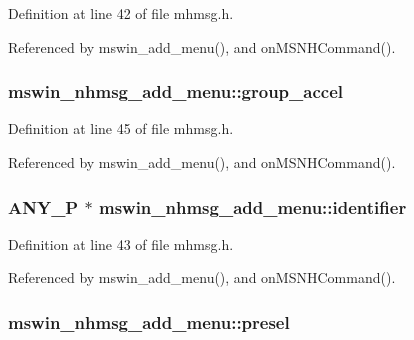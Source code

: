 Definition at line 42 of file mhmsg.\+h.



Referenced by mswin\+\_\+add\+\_\+menu(), and on\+M\+S\+N\+H\+Command().

\hypertarget{structmswin__nhmsg__add__menu_a5ad28b8447917e56539afb498fffc98a}{
\subsubsection[{group\+\_\+accel}]{ mswin\+\_\+nhmsg\+\_\+add\+\_\+menu\+::group\+\_\+accel}}\label{structmswin__nhmsg__add__menu_a5ad28b8447917e56539afb498fffc98a}


Definition at line 45 of file mhmsg.\+h.



Referenced by mswin\+\_\+add\+\_\+menu(), and on\+M\+S\+N\+H\+Command().

\hypertarget{structmswin__nhmsg__add__menu_a5ce3f435709df4a7e6442cebba1593ee}{
\subsubsection[{identifier}]{ {\bf A\+N\+Y\+\_\+\+P} $\ast$ mswin\+\_\+nhmsg\+\_\+add\+\_\+menu\+::identifier}}\label{structmswin__nhmsg__add__menu_a5ce3f435709df4a7e6442cebba1593ee}


Definition at line 43 of file mhmsg.\+h.



Referenced by mswin\+\_\+add\+\_\+menu(), and on\+M\+S\+N\+H\+Command().

\hypertarget{structmswin__nhmsg__add__menu_aff828569cd76f607d077f89e23383938}{
\subsubsection[{presel}]{ mswin\+\_\+nhmsg\+\_\+add\+\_\+menu\+::presel}}\label{structmswin__nhmsg__add__menu_aff828569cd76f607d077f89e23383938}


